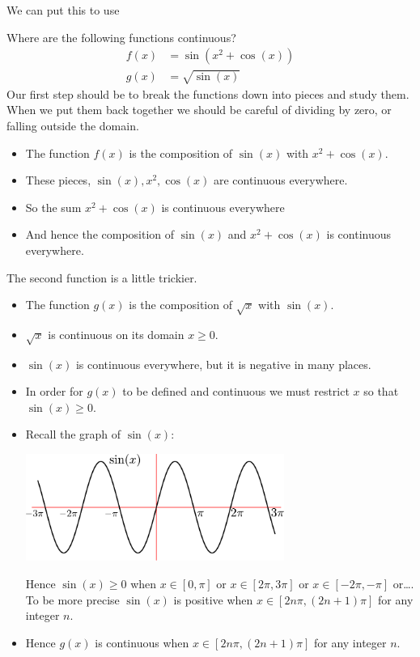 We can put this to use
\begin{eg}
Where are the following functions continuous?
\begin{align*}
  f(x) &= \sin\left( x^2 +\cos(x) \right) \\
  g(x) &= \sqrt{\sin(x)}
\end{align*}
Our first step should be to break the functions down into pieces and study
them. When we put them back together we should be careful of dividing by zero,
or falling outside the domain.
\begin{itemize}
 \item The function $f(x)$ is the composition of $\sin(x)$ with $x^2+\cos(x)$.
 \item These pieces, $\sin(x), x^2, \cos(x)$ are continuous everywhere.
 \item So the sum $x^2+\cos(x)$ is continuous everywhere
 \item And hence the composition of $\sin(x)$ and $x^2+\cos(x)$ is continuous
everywhere.
\end{itemize}
The second function is a little trickier.
\begin{itemize}
 \item The function $g(x)$ is the composition of $\sqrt{x}$ with $\sin(x)$.
 \item $\sqrt{x}$ is continuous on its domain $x \geq 0$.
 \item $\sin(x)$ is continuous everywhere, but it is negative in many places.
 \item In order for $g(x)$ to be defined and continuous we must restrict $x$ so that
$\sin(x) \geq 0$.
 \item Recall the graph of $\sin(x)$:
\begin{efig}
\begin{center}
 \includegraphics[height=35mm]{sinx}
\end{center}
\end{efig}
 Hence $\sin(x)\geq 0$ when $x\in[0,\pi]$ or $x\in [2\pi,3\pi]$ or $x\in[-2\pi,-\pi]$
or\dots. To be more precise $\sin(x)$ is positive when $x \in [2n\pi,(2n+1)\pi]$ for any
integer $n$.
\item Hence $g(x)$ is continuous when $x \in [2n\pi,(2n+1)\pi]$ for any
integer $n$.
\end{itemize}


\end{eg}
